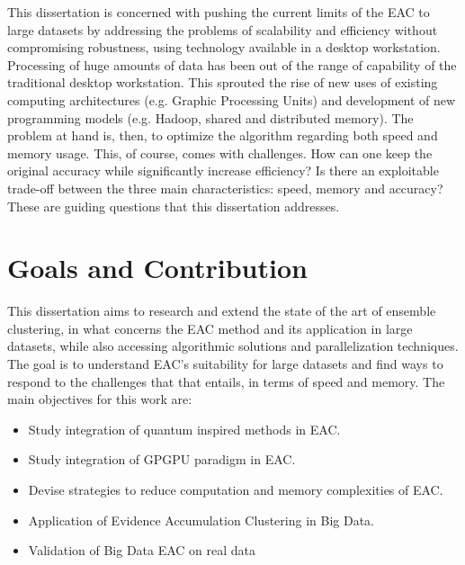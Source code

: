 This dissertation is concerned with pushing the current limits of the EAC to large datasets by addressing the problems of scalability and efficiency without compromising robustness, using technology available in a desktop workstation.
Processing of huge amounts of data has been out of the range of capability of the traditional desktop workstation.
This sprouted the rise of new uses of existing computing architectures (e.g. Graphic Processing Units) and development of new programming models (e.g. Hadoop, shared and distributed memory).
The problem at hand is, then, to  optimize the algorithm regarding both speed and memory usage.
This, of course, comes with challenges.
How can one keep the original accuracy while significantly increase efficiency?
Is there an exploitable trade-off between the three main characteristics: speed, memory and accuracy?
These are guiding questions that this dissertation addresses.


\section{Goals and Contribution}

This dissertation aims to research and extend the state of the art of ensemble clustering, in what concerns the EAC method and its application in large datasets, while also accessing algorithmic solutions and parallelization techniques.
The goal is to understand EAC's suitability for large datasets and find ways to respond to the challenges that that entails, in terms of speed and memory.
The main objectives for this work are:
\begin{itemize}

\item Study integration of quantum inspired methods in EAC.

\item Study integration of GPGPU paradigm in EAC.

\item Devise strategies to reduce computation and memory complexities of EAC.

\item Application of Evidence Accumulation Clustering in Big Data.

\item Validation of Big Data EAC on real data%
\end{itemize}

